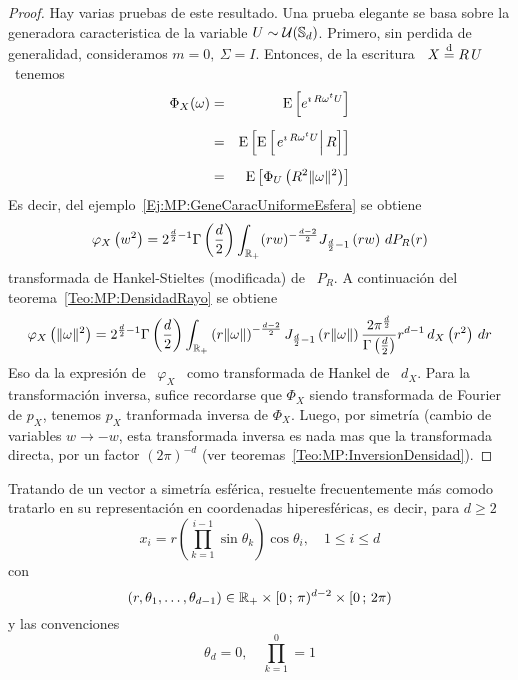 \begin{proof}
  Hay varias  pruebas de este  resultado. Una prueba  elegante se basa  sobre la
  generadora caracteristica  de la variable $U \sim  \mathcal{U}(\mathbb{S}_d)$.  Primero, sin
  perdida de generalidad,  consideramos $m = 0, \: \Sigma =  I$. Entonces, de la
  escritura \ $X \stackrel{\mathrm{d}}{=} R \, U$ \ tenemos
  \begin{eqnarray*}
  \Phi_X(\omega) & = & \operatorname{E}\left[ e^{\imath \, R \omega^t U} \right]\\[2mm]
  & = & \operatorname{E}\left[ \operatorname{E}\left[ \left. e^{\imath \, R \omega^t U} \right| R \right]
  \right]\\[2mm]
  & = & \operatorname{E}\left[ \Phi_U\left( R^2 \| \omega \|^2 \right)  \right]
  \end{eqnarray*}
  Es    decir,    del    ejemplo~\ref{Ej:MP:GeneCaracUniformeEsfera} se obtiene
  \[
  \varphi_X\left(  w^2  \right)  =  2^{\frac{d}{2}-1}  \Gamma\left(
    \frac{d}{2}  \right)  \int_{\mathbb{R}_+}  (r w)^{-
    \frac{d-2}{2}}  J_{\frac{d}{2}-1}  \left( r  w \right)  \, dP_R(r)
  \]
  transformada de Hankel-Stieltes (modificada)  de \ $P_R$. A continuaci\'on del
  teorema~\ref{Teo:MP:DensidadRayo} se obtiene
  \[
  \varphi_X\left(  \|  \omega  \|^2  \right)  =  2^{\frac{d}{2}-1}  \Gamma\left(
    \frac{d}{2}  \right)  \int_{\mathbb{R}_+}  \left(   r  \|  \omega  \|  \right)^{-
    \frac{d-2}{2}}  J_{\frac{d}{2}-1}  \left( r  \|  \omega  \| \right)  \frac{2
    \pi^{\frac{d}{2}}}{\Gamma\left(  \frac{d}{2} \right)}  r^{d-1}  \, d_X\left(
    r^2 \right) \, dr
  \]
  Eso da  la expresi\'on  de \ $\varphi_X$  \ como  transformada de Hankel  de \
  $d_X$. Para la transformaci\'on inversa, sufice recordarse que $\Phi_X$ siendo
  transformada  de  Fourier  de  $p_X$,  tenemos $p_X$  tranformada  inversa  de
  $\Phi_X$.  Luego,  por  simetr\'ia  (cambio  de variables  $w  \to  -w$,  esta
  transformada inversa  es nada mas que  la transformada directa,  por un factor
  $(2 \pi)^{-d}$ (ver teoremas~\ref{Teo:MP:InversionDensidad}).
\end{proof}

Tratando  de un vector  a simetr\'ia  esf\'erica, resuelte  frecuentemente m\'as
comodo  tratarlo  en su  representaci\'on  en  coordenadas hiperesf\'ericas,  es
decir, para $d \ge 2$
%
\[
x_i = r \left( \prod_{k=1}^{i-1} \sin\theta_k \right) \cos \theta_i, \quad 1 \le
i \le d
\]
%
con
%
\[
(r,\theta_1,\ldots,\theta_{d-1}) \in  \mathbb{R}_+ \times [0 \, ; \,  \pi)^{d-2} \times [0
\, ; \, 2 \pi)
\]
%
y las convenciones
%
\[
\theta_d = 0, \quad \prod_{k=1}^{0} = 1
\]

